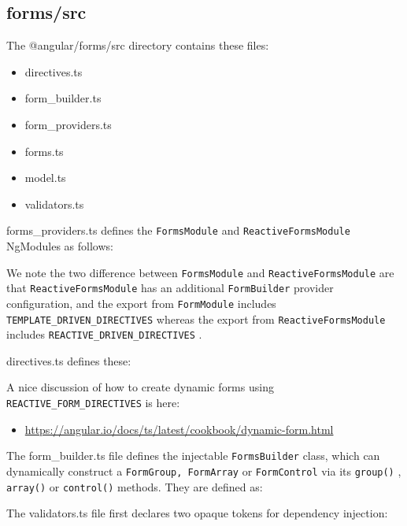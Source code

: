 \subsection{forms/src}

The @angular/forms/src directory contains these files:

\begin{itemize}
  \item directives.ts
  \item form\_builder.ts
  \item form\_providers.ts
  \item forms.ts
  \item model.ts
  \item validators.ts
\end{itemize}

forms\_providers.ts defines the
\texttt{FormsModule}
and
\texttt{ReactiveFormsModule}
NgModules as
follows:



We note the two difference between
\texttt{FormsModule}
and
\texttt{ReactiveFormsModule}
are that
\texttt{ReactiveFormsModule}
has an additional
\texttt{FormBuilder}
provider configuration, and the
export from
\texttt{FormModule}
includes
\texttt{TEMPLATE\_DRIVEN\_DIRECTIVES}
whereas the export
from
\texttt{ReactiveFormsModule}
includes
\texttt{REACTIVE\_DRIVEN\_DIRECTIVES}
.

directives.ts defines these:



A nice discussion of how to create dynamic forms using
\texttt{REACTIVE\_FORM\_DIRECTIVES}
is here:

\begin{itemize}
  \item \url{https://angular.io/docs/ts/latest/cookbook/dynamic-form.html}
\end{itemize}

The form\_builder.ts file defines the injectable
\texttt{FormsBuilder}
class, which can
dynamically construct a
\texttt{FormGroup, FormArray}
or
\texttt{FormControl}
via its
\texttt{group()}
,
\texttt{array()}
or
\texttt{control()}
methods. They are defined as:



The validators.ts file first declares two opaque tokens for dependency injection:



